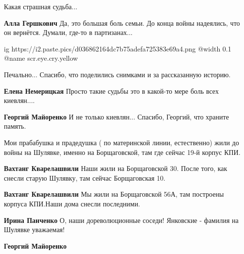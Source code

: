  
 
 
 
 
\zzSecCmt

\begin{itemize} %
Какая страшная судьба...

\textbf{Алла Гершкович} Да, это большая боль семьи. До конца войны надеялись, что он вернётся. Думали, где-то в партизанах...


\ifcmt
  ig https://i2.paste.pics/d036862164dc7b75adefa725383e69a4.png
  @width 0.1
	@name scr.eye.cry.yellow
\fi

Печально... Спасибо, что поделились снимками и за рассказанную историю.

\begin{itemize} %
\textbf{Елена Немерицкая} Просто такие судьбы это в какой-то мере боль всех киевлян....

\textbf{Георгий Майоренко} И не только киевлян... Спасибо, Георгий, что храните память.
\end{itemize} %


Мои прабабушка и прадедушка ( по материнской линии, естественно) жили до войны
на Шулявке, именно на Борщаговской, там где сейчас 19-й корпус КПИ.

\begin{itemize} %
\textbf{Вахтанг Кварелашвили} Наши жили на Борщаговской 30. После того, как снесли старую Шулявку, там сейчас Борщаговская 10.

\textbf{Вахтанг Кварелашвили} Мы жили на Борщаговской 56А, там построены корпуса КПИ.Наши дома снесли последними.

\begin{itemize} %
\textbf{Ирина Панченко} О, наши дореволюционные соседи! Янковские - фамилия на Шулявке уважаемая!

\textbf{Георгий Майоренко} 


\end{itemize}
\end{itemize}
\end{itemize}
